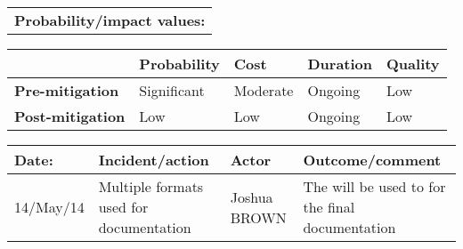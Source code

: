 \begin{table}
\begin{tabularx}{\textwidth}{| X |}
		\hline
		\textbf{Probability/impact values:} \\
	\end{tabularx}
	\begin{tabularx}{\textwidth}{| l | l | X | X | X |}
		\hline
		 &  \textbf{Probability} & \textbf{Cost} & \textbf{Duration} & \textbf{Quality} \\ \hline
		\textbf{Pre-mitigation} & Significant & Moderate & Ongoing & Low \\ \hline
		\textbf{Post-mitigation} & Low & Low & Ongoing & Low \\ \hline \hline
	\end{tabularx}
	\begin{tabularx}{\textwidth}{| l | X | l | X |}
		\hline
		\textbf{Date:} & \textbf{Incident/action} & \textbf{Actor} & \textbf{Outcome/comment} \\ \hline
		14/May/14 & Multiple formats used for documentation  & Joshua BROWN  & The \latex will be used to for the final documentation  \\ \hline
	\end{tabularx}%
\end{table}

